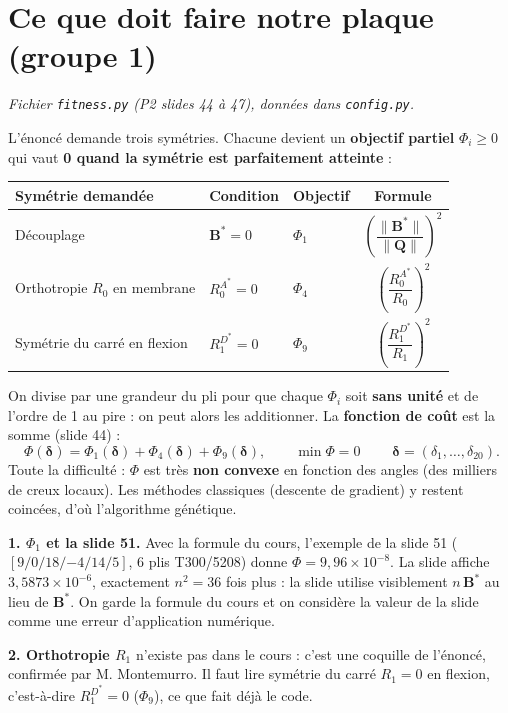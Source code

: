 \documentclass[11pt,a4paper]{article}
\newcommand{\Bs}{\mathbf{B}^{*}}
\newcommand{\Q}{\mathbf{Q}}
\newcommand{\code}[1]{\texttt{#1}}
\begin{document}
\section{Ce que doit faire notre plaque (groupe 1)}
\emph{Fichier \code{fitness.py} (P2 slides 44 à 47), données dans
\code{config.py}.}

L'énoncé demande trois symétries. Chacune devient un \textbf{objectif
partiel} $\Phi_i \ge 0$ qui vaut \textbf{0 quand la symétrie est
parfaitement atteinte} :
\begin{center}
\begin{tabularx}{\linewidth}{X l l c}
\toprule
Symétrie demandée & Condition & Objectif & Formule\\
\midrule
Découplage & $\Bs = 0$ & $\Phi_1$ & $\left(\dfrac{\|\Bs\|}{\|\Q\|}\right)^{2}$\\[2.2ex]
Orthotropie $R_0$ en membrane & $R_0^{A^*}=0$ & $\Phi_4$ & $\left(\dfrac{R_0^{A^*}}{R_0}\right)^{2}$\\[2.2ex]
Symétrie du carré en flexion & $R_1^{D^*}=0$ & $\Phi_9$ & $\left(\dfrac{R_1^{D^*}}{R_1}\right)^{2}$\\[1.5ex]
\bottomrule
\end{tabularx}
\end{center}
On divise par une grandeur du pli pour que chaque $\Phi_i$ soit \textbf{sans
unité} et de l'ordre de 1 au pire : on peut alors les additionner. La
\textbf{fonction de coût} est la somme (slide 44) :
\[
\boxed{\;\Phi(\boldsymbol\delta) = \Phi_1(\boldsymbol\delta) + \Phi_4(\boldsymbol\delta) + \Phi_9(\boldsymbol\delta),
\qquad \min \Phi = 0\;}
\qquad \boldsymbol\delta = (\delta_1, \dots, \delta_{20}).
\]
Toute la difficulté : $\Phi$ est très \textbf{non convexe} en fonction des
angles (des milliers de creux locaux). Les méthodes classiques (descente de
gradient) y restent coincées, d'où l'algorithme génétique.

\begin{attention}
\textbf{1. $\Phi_1$ et la slide 51.} Avec la formule du cours, l'exemple de
la slide 51 ($[9/0/18/{-4}/14/5]$, 6 plis T300/5208) donne
$\Phi = 9{,}96\times10^{-8}$. La slide affiche $3{,}5873\times10^{-6}$,
exactement $n^2 = 36$ fois plus : la slide utilise visiblement $n\,\Bs$ au
lieu de $\Bs$. On garde la formule du cours et on considère la valeur de la
slide comme une erreur d'application numérique.

\textbf{2. \og Orthotropie $R_1$\fg} n'existe pas dans le cours : c'est
une coquille de l'énoncé, confirmée par M. Montemurro. Il faut lire
\og symétrie du carré $R_1=0$ en flexion\fg, c'est-à-dire $R_1^{D^*}=0$
($\Phi_9$), ce que fait déjà le code.
\end{attention}
\end{document}
